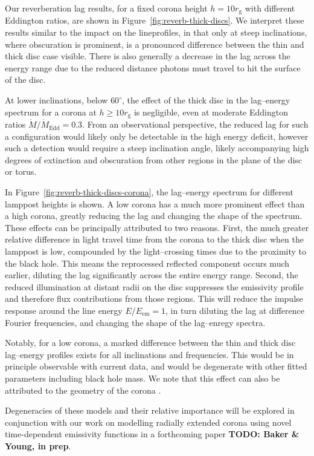 \documentclass[fleqn,usenatbib]{mnras}
\newcommand{\todo}[1]{{\noindent \bf \color{red} TODO: #1}}
\newcommand{\rg}{r_\text{g}}
\begin{document}
Our reverberation lag results, for a fixed corona height $h=10 \rg$ with
different Eddington ratios, are shown in Figure~\ref{fig:reverb-thick-discs}. We
interpret these results similar to the impact on the lineprofiles, in that only
at steep inclinations, where obscuration is prominent, is a pronounced
difference between the thin and thick disc case visible. There is also generally a decrease in the lag
across the energy range due to the reduced distance photons must travel to hit
the surface of the disc.

At lower inclinations, below $60^\circ$, the effect of the thick disc in the
lag--energy spectrum for a corona at $h \geq 10 \rg$ is negligible, even at
moderate Eddington ratios $\dot{M} / \dot{M}_\text{Edd} = 0.3$. From an
observational perspective, the reduced lag for such a configuration would likely
only be detectable in the high energy deficit, however such a detection would
require a steep inclination angle, likely accompanying high degrees of
extinction and obscuration from other regions in the plane of the disc or torus.

In Figure~\ref{fig:reverb-thick-discs-corona}, the lag--energy spectrum for
different lamppost heights is shown. A low corona has a much more prominent
effect than a high corona, greatly reducing the lag and changing the shape of
the spectrum. These effects can be principally attributed to two reasons. First,
the much greater relative difference in light travel time from the corona to the
thick disc when the lamppost is low, compounded by the light--crossing times due
to the proximity to the black hole. This means the reprocessed reflected
component occurs much earlier, diluting the lag significantly across the entire
energy range. Second, the reduced illumination at distant radii on the disc
suppresses the emissivity profile and therefore flux contributions from those
regions. This will reduce the impulse response around the line energy $E /
E_\text{em} =
1$, in turn diluting the lag at difference Fourier frequencies, and changing the
shape of the lag--enregy spectra.

Notably, for a low corona, a marked difference between the thin and thick disc
lag--energy profiles exists for all inclinations and frequencies. This would be
in principle observable with current data, and would be degenerate with other
fitted parameters including black hole mass. We note that this effect can also
be attributed to the geometry of the corona \citep[see
e.g.][]{wilkins_towards_2016}.

Degeneracies of these models and their relative importance will be explored in
conjunction with our work on modelling radially extended corona using novel
time-dependent emissivity functions in a forthcoming paper \todo{Baker \& Young,
in prep}.
\end{document}
